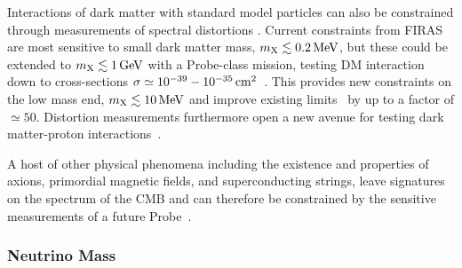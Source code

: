 Interactions of dark matter with standard model particles can also be constrained through 
measurements of spectral distortions \cite{Yacine2015DM}. 
Current constraints from FIRAS are most sensitive to small dark matter
mass, $m_{\rm X}\lesssim 0.2\,{\rm MeV}$, but these could be extended to $m_{\rm X}\lesssim 1\,{\rm GeV}$ with a 
Probe-class mission, testing DM interaction down to cross-sections 
$\sigma\simeq 10^{-39}-10^{-35}\,{\rm cm}^2$~\cite{Yacine2015DM}. This provides new constraints on the low mass end, $m_{\rm X}\lesssim 10\,{\rm MeV}$ and improve existing limits~\cite{Essig2012PhRvL.109b1301E, Boehm2014MNRAS.445L..31B} by up to a factor of $\simeq 50$. Distortion measurements furthermore open a new avenue for testing dark matter-proton interactions~\cite{Yacine2015DM}.

A host of other physical phenomena including the existence and properties of axions, primordial magnetic fields, and 
superconducting strings, leave signatures on the spectrum of the CMB and can therefore be constrained by 
the sensitive measurements  of a future Probe~\cite[e.g.,][]{Jedamzik2000, Tashiro2012, Dolgov2013, Tashiro2013, Caldwell2013}.


\vspace{-0.15in}

\subsubsection{Neutrino Mass}

\vspace{-0.05in}

